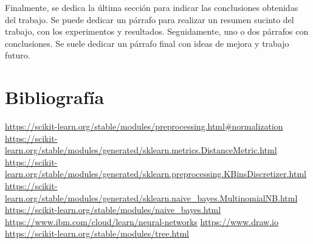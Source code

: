 \documentclass[conference,a4paper]{IEEEtran}
\begin{document}
Finalmente, se dedica la última sección para indicar las conclusiones obtenidas
del trabajo. Se puede dedicar un párrafo para realizar un resumen sucinto del
trabajo, con los experimentos y resultados. Seguidamente, uno o dos párrafos
con conclusiones. Se suele dedicar un párrafo final con ideas de mejora y
trabajo futuro.


\section{Bibliografía}
\begin{thebibliography}{00}
 \url{https://scikit-learn.org/stable/modules/preprocessing.html#normalization}
 \url{https://scikit-learn.org/stable/modules/generated/sklearn.metrics.DistanceMetric.html}
 \url{https://scikit-learn.org/stable/modules/generated/sklearn.preprocessing.KBinsDiscretizer.html}
 \url{https://scikit-learn.org/stable/modules/generated/sklearn.naive_bayes.MultinomialNB.html}
 \url{https://scikit-learn.org/stable/modules/naive_bayes.html}
 \url{https://www.ibm.com/cloud/learn/neural-networks}
 \url{https://www.draw.io}
 \url{https://scikit-learn.org/stable/modules/tree.html }


\end{thebibliography}
\end{document}
